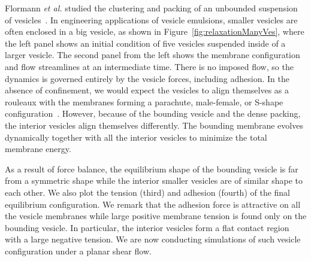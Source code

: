 \documentclass[prf,superscriptaddress,showkeys]{revtex4-1}
\begin{document}
Flormann {\it et al.} studied the clustering and packing of an
unbounded suspension of vesicles~\cite{FlormannAouane2017_SciReports}.  In engineering
applications of vesicle emulsions, smaller vesicles are often enclosed in
a big vesicle, as shown in Figure~\ref{fig:relaxationManyVes}, where
the left panel shows an initial condition of five vesicles suspended
inside of a larger vesicle.  The second panel from the left shows the
membrane configuration and flow streamlines at an intermediate time.
There is no imposed flow, so the dynamics is governed entirely by the
vesicle forces, including adhesion.  In the absence of confinement, we
would expect the vesicles to align themselves as a rouleaux with the
membranes forming a parachute, male-female, or S-shape
configuration~\cite{FlormannAouane2017_SciReports}.  However, because of
the bounding vesicle and the dense packing, the interior vesicles align
themselves differently.  The bounding membrane evolves dynamically
together with all the interior vesicles to minimize the total membrane
energy.

As a result of force balance, the equilibrium shape of the bounding
vesicle is far from a symmetric shape while the interior smaller
vesicles are of similar shape to each other.  We also plot the tension
(third) and adhesion (fourth) of the final equilibrium configuration.
We remark that the adhesion force is attractive on all the vesicle
membranes while large positive membrane tension is found only on the
bounding vesicle.  In particular, the interior vesicles form a flat
contact region with a large negative tension.  We are now conducting
simulations of such vesicle configuration under a planar shear flow.
\end{document}
